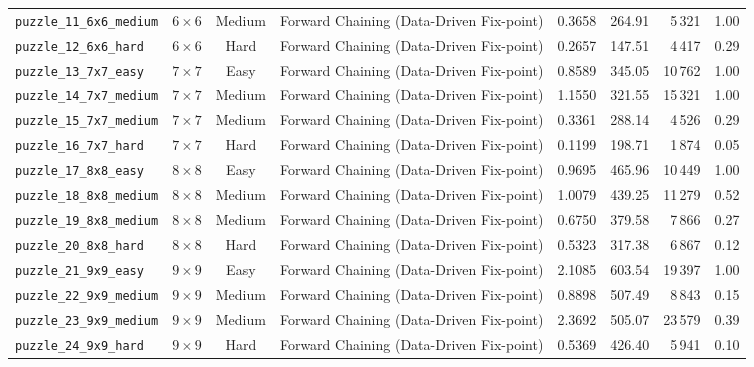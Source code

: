 \documentclass{article}
\begin{document}
\begin{longtable}{@{}lccl r r r c@{}}
  \texttt{puzzle\_11\_6x6\_medium} & $6\times6$ & Medium & Forward Chaining (Data-Driven Fix-point) & 0.3658 & 264.91 & 5\,321 & 1.00 \\
  \texttt{puzzle\_12\_6x6\_hard} & $6\times6$ & Hard & Forward Chaining (Data-Driven Fix-point) & 0.2657 & 147.51 & 4\,417 & 0.29 \\
  \texttt{puzzle\_13\_7x7\_easy} & $7\times7$ & Easy & Forward Chaining (Data-Driven Fix-point) & 0.8589 & 345.05 & 10\,762 & 1.00 \\
  \texttt{puzzle\_14\_7x7\_medium} & $7\times7$ & Medium & Forward Chaining (Data-Driven Fix-point) & 1.1550 & 321.55 & 15\,321 & 1.00 \\
  \texttt{puzzle\_15\_7x7\_medium} & $7\times7$ & Medium & Forward Chaining (Data-Driven Fix-point) & 0.3361 & 288.14 & 4\,526 & 0.29 \\
  \texttt{puzzle\_16\_7x7\_hard} & $7\times7$ & Hard & Forward Chaining (Data-Driven Fix-point) & 0.1199 & 198.71 & 1\,874 & 0.05 \\
  \texttt{puzzle\_17\_8x8\_easy} & $8\times8$ & Easy & Forward Chaining (Data-Driven Fix-point) & 0.9695 & 465.96 & 10\,449 & 1.00 \\
  \texttt{puzzle\_18\_8x8\_medium} & $8\times8$ & Medium & Forward Chaining (Data-Driven Fix-point) & 1.0079 & 439.25 & 11\,279 & 0.52 \\
  \texttt{puzzle\_19\_8x8\_medium} & $8\times8$ & Medium & Forward Chaining (Data-Driven Fix-point) & 0.6750 & 379.58 & 7\,866 & 0.27 \\
  \texttt{puzzle\_20\_8x8\_hard} & $8\times8$ & Hard & Forward Chaining (Data-Driven Fix-point) & 0.5323 & 317.38 & 6\,867 & 0.12 \\
  \texttt{puzzle\_21\_9x9\_easy} & $9\times9$ & Easy & Forward Chaining (Data-Driven Fix-point) & 2.1085 & 603.54 & 19\,397 & 1.00 \\
  \texttt{puzzle\_22\_9x9\_medium} & $9\times9$ & Medium & Forward Chaining (Data-Driven Fix-point) & 0.8898 & 507.49 & 8\,843 & 0.15 \\
  \texttt{puzzle\_23\_9x9\_medium} & $9\times9$ & Medium & Forward Chaining (Data-Driven Fix-point) & 2.3692 & 505.07 & 23\,579 & 0.39 \\
  \texttt{puzzle\_24\_9x9\_hard} & $9\times9$ & Hard & Forward Chaining (Data-Driven Fix-point) & 0.5369 & 426.40 & 5\,941 & 0.10 \\
\end{longtable}
\end{document}
